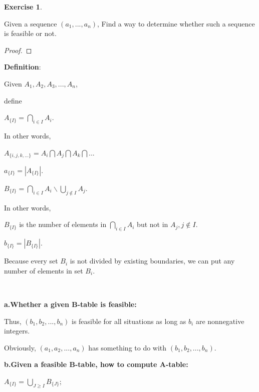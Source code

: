 \documentclass[12pt,a4]{article}
\theoremstyle{exercise}
\newtheorem{exercise}[theorem]{Exercise}
\begin{document}
\begin{exercise}
\end{exercise}
	Given a sequence $(a_1,...,a_n)$, Find a way to determine whether such a sequence is feasible or not.

\begin{proof}
\end{proof}

 \textbf{Definition}: 
 

     Given $A_1,A_2,A_3,...,A_n$, 
     
     define 
     \begin{center}
      $A_{\{I\}}=\bigcap \limits_{i \in I} A_i $. 
     \end{center} 

     In other words, 

     \begin{center}
      $A_{\{i,j,k,...\}}= A_i \bigcap A_j \bigcap A_k \bigcap ...$
      
      $a_{\{I\}}=|A_{\{I\}}|.$
     
      $B_{\{I\}}=\bigcap \limits_{i \in I} A_i \backslash \bigcup \limits_{j\notin I }{A_j}$.
     \end{center}
     
     In other words,
     \begin{center}
      $B_{\{I\}}$ is the number of elements in $\bigcap \limits_{i \in I} A_i$ but not in $A_j,j\notin I$.
     
      $b_{\{I\}}=|B_{\{I\}}|.$
     \end{center}
     
     Because every set $B_i$ is not divided by existing boundaries, we can put any number of elements in set $B_i$.
     
     \ 

     \textbf{a.Whether a given B-table is feasible:}

     
     Thus, $(b_1,b_2,...,b_n)$ is feasible for all situations as long as $b_i$ are nonnegative integers.

     Obviously, $(a_1,a_2,...,a_n)$ has something to do with $(b_1,b_2,...,b_n)$.
     
     \textbf{b.Given a feasible B-table, how to compute A-table:}

	 \begin{center}
     $A_{\{I\}}=\bigcup \limits_{J\ge I}B_{\{J\}}$;
     \end{center}
\end{document}
